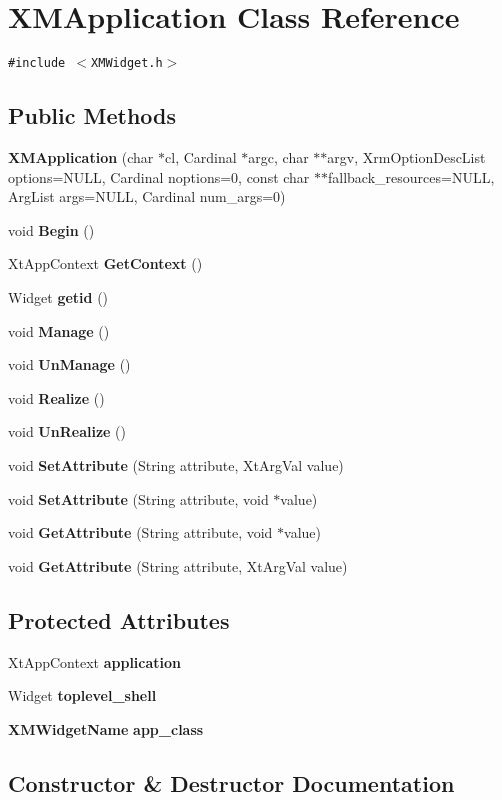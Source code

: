 \section{XMApplication  Class Reference}
\label{classXMApplication}
{\tt \#include $<$XMWidget.h$>$}

\subsection*{Public Methods}
\begin{CompactItemize}
\item 
{\bf XMApplication} (char $\ast$cl, Cardinal $\ast$argc, char $\ast$$\ast$argv, Xrm\-Option\-Desc\-List options=NULL, Cardinal noptions=0, const char $\ast$$\ast$fallback\_\-resources=NULL, Arg\-List args=NULL, Cardinal num\_\-args=0)
\item 
void {\bf Begin} ()
\item 
Xt\-App\-Context {\bf Get\-Context} ()
\item 
Widget {\bf getid} ()
\item 
void {\bf Manage} ()
\item 
void {\bf Un\-Manage} ()
\item 
void {\bf Realize} ()
\item 
void {\bf Un\-Realize} ()
\item 
void {\bf Set\-Attribute} (String attribute, Xt\-Arg\-Val value)
\item 
void {\bf Set\-Attribute} (String attribute, void $\ast$value)
\item 
void {\bf Get\-Attribute} (String attribute, void $\ast$value)
\item 
void {\bf Get\-Attribute} (String attribute, Xt\-Arg\-Val value)
\end{CompactItemize}
\subsection*{Protected Attributes}
\begin{CompactItemize}
\item 
Xt\-App\-Context {\bf application}
\item 
Widget {\bf toplevel\_\-shell}
\item 
{\bf XMWidget\-Name} {\bf app\_\-class}
\end{CompactItemize}


\subsection{Constructor \& Destructor Documentation}

